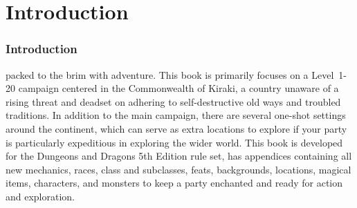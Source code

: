\part{Introduction} \label{Intro}
\section{Introduction}
 packed to the brim with adventure. This book is primarily focuses on a Level~1-20 campaign centered in the Commonwealth of Kiraki, a country unaware of a rising threat and deadset on adhering to self-destructive old ways and troubled traditions. In addition to the main campaign, there are several one-shot settings around the continent, which can serve as extra locations to explore if your party is particularly expeditious in exploring the wider world. This book is developed for the Dungeons and Dragons 5th Edition rule set, has appendices containing all new mechanics, races, class and subclasses, feats, backgrounds, locations, magical items, characters, and monsters to keep a party enchanted and ready for action and exploration. \\

